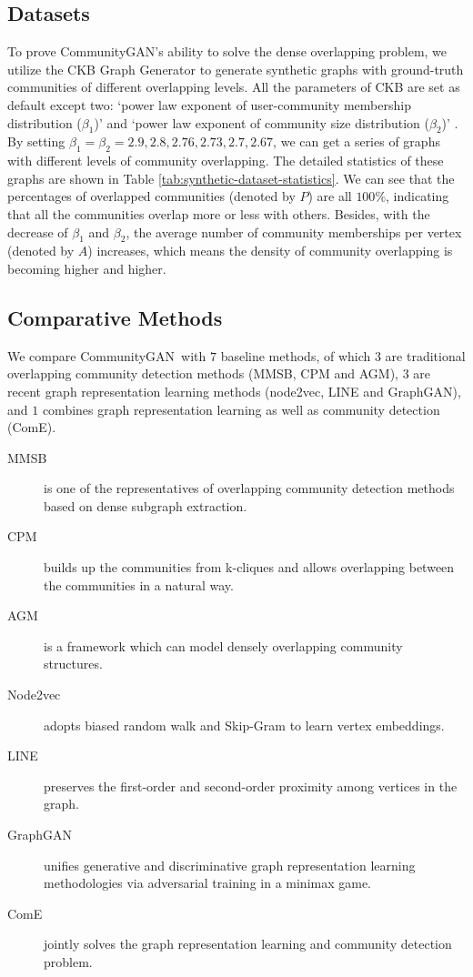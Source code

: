 \documentclass[sigconf]{acmart}
\newcommand{\ComGAN}{CommunityGAN}
\begin{document}
\subsection{Datasets}
To prove \ComGAN's ability to solve the dense overlapping problem, we utilize the CKB Graph Generator to generate synthetic graphs with ground-truth communities of different overlapping levels.
All the parameters of CKB are set as default except two: `power law exponent of user-community membership distribution ($\beta_1$)' and `power law exponent of community size distribution ($\beta_2$)' \cite{ckb-benchmark}.
By setting $\beta_1 = \beta_2 = {2.9, 2.8, 2.76, 2.73, 2.7, 2.67}$, we can get a series of graphs with different levels of community overlapping.
The detailed statistics of these graphs are shown in Table \ref{tab:synthetic-dataset-statistics}.
We can see that the percentages of overlapped communities (denoted by $P$) are all $100\%$, indicating that all the communities overlap more or less with others.
Besides, with the decrease of $\beta_1$ and $\beta_2$, the average number of community memberships per vertex (denoted by $A$) increases, which means the density of community overlapping is becoming higher and higher.

\subsection{Comparative Methods}

We compare \ComGAN~with $7$ baseline methods, of which $3$ are traditional overlapping community detection methods (MMSB, CPM and AGM), $3$ are recent graph representation learning methods (node2vec, LINE and GraphGAN), and $1$ combines graph representation learning as well as community detection (ComE).

\begin{description}
\item[MMSB] \cite{airoldi2009mixed} is one of the representatives of overlapping community detection methods based on dense subgraph extraction.
\item[CPM] \cite{CPM} builds up the communities from k-cliques and allows overlapping between the communities in a natural way.
\item[AGM] \cite{yang2013overlapping} is a framework which can model densely overlapping community structures.
\item[Node2vec] \cite{node2vec} adopts biased random walk and Skip-Gram to learn vertex embeddings.
\item[LINE] \cite{LINE} preserves the first-order and second-order proximity among vertices in the graph.
\item[GraphGAN] \cite{GraphGAN} unifies generative and discriminative graph representation learning methodologies via adversarial training in a minimax game.
\item[ComE] \cite{ComE} jointly solves the graph representation learning and community detection problem.
\end{description}
\end{document}
